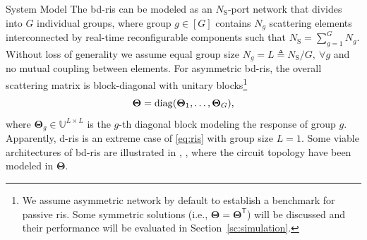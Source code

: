 \documentclass[journal]{IEEEtran}
\begin{document}
\begin{section}{System Model}
		The \gls{bd}-\gls{ris} can be modeled as an $N_\mathrm{S}$-port network \cite{Ivrlac2010} that divides into $G$ individual groups, where group $g \in [G]$ contains $N_g$ scattering elements interconnected by real-time reconfigurable components \cite{Shen2020a} such that $N_\mathrm{S} = \sum_{g=1}^G N_g$.
		Without loss of generality we assume equal group size $N_g = L \triangleq N_\mathrm{S} / G, \ \forall g$ and no mutual coupling between elements.
		For asymmetric \gls{bd}-\gls{ris}, the overall scattering matrix is block-diagonal with unitary blocks\footnote{We assume asymmetric network by default to establish a benchmark for passive \gls{ris}. Some symmetric solutions (i.e., $\mathbf{\Theta} = \mathbf{\Theta}^\mathsf{T}$) will be discussed and their performance will be evaluated in Section~\ref{sc:simulation}.}
		\begin{equation}
			\label{eq:ris}
			\mathbf{\Theta} = \operatorname{diag}(\mathbf{\Theta}_1,\ldots,\mathbf{\Theta}_G),
		\end{equation}
		where $\mathbf{\Theta}_g \in \mathbb{U}^{L \times L}$ is the $g$-th diagonal block modeling the response of group $g$.
		Apparently, \gls{d}-\gls{ris} is an extreme case of \eqref{eq:ris} with group size $L=1$.
		Some viable architectures of \gls{bd}-\gls{ris} are illustrated in \cite[Fig. 3]{Shen2020a}, \cite[Fig. 5]{Li2023c}, \cite[Fig. 2]{Nerini2024} where the circuit topology have been modeled in $\mathbf{\Theta}$.


\end{section}
\end{document}

